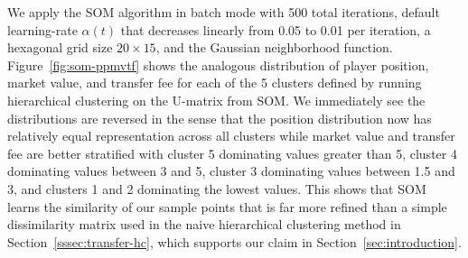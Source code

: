 We apply the SOM algorithm in batch mode with 500 total iterations, 
default learning-rate $\alpha(t)$ that decreases linearly from 0.05 to 0.01 per iteration,
a hexagonal grid size $20 \times 15$,
and the Gaussian neighborhood function.
Figure~\ref{fig:som-ppmvtf} shows the analogous distribution of
player position, market value, and transfer fee for each of the 5 clusters
defined by running hierarchical clustering on the U-matrix from SOM.
We immediately see the distributions are reversed in the sense that
the position distribution now has relatively equal representation across all clusters
while market value and transfer fee are better stratified with
cluster 5 dominating values greater than 5, 
cluster 4 dominating values between 3 and 5,
cluster 3 dominating values between 1.5 and 3,
and clusters 1 and 2 dominating the lowest values.
This shows that SOM learns the similarity of our sample points
that is far more refined than a simple dissimilarity matrix
used in the naive hierarchical clustering method in Section~\ref{sssec:transfer-hc},
which supports our claim in Section~\ref{sec:introduction}.


